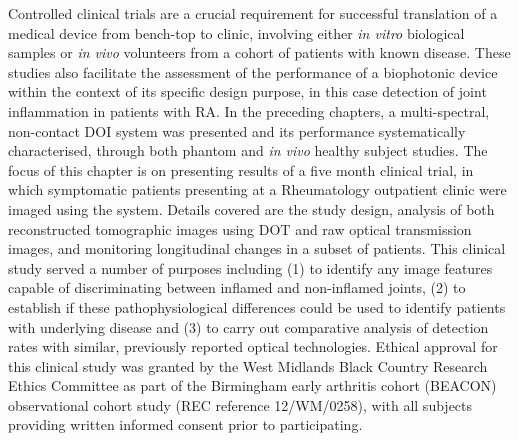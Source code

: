 \documentclass[twoside]{bhamthesis}
\theoremstyle{definition}
\begin{document}
Controlled clinical trials are a crucial requirement for successful translation of a medical device from bench-top to clinic, involving either \textit{in vitro} biological samples or \textit{in vivo} volunteers from a cohort of patients with known disease. These studies also facilitate the assessment of the performance of a biophotonic device within the context of its specific design purpose, in this case detection of joint inflammation in patients with RA. In the preceding chapters, a multi-spectral, non-contact DOI system was presented and its performance systematically characterised, through both phantom and \textit{in vivo} healthy subject studies. The focus of this chapter is on presenting results of a five month clinical trial, in which symptomatic patients presenting at a Rheumatology outpatient clinic were imaged using the system. Details covered are the study design, analysis of both reconstructed tomographic images using DOT and raw optical transmission images, and monitoring longitudinal changes in a subset of patients. This clinical study served a number of purposes including (1) to identify any image features capable of discriminating between inflamed and non-inflamed joints, (2) to establish if these pathophysiological differences could be used to identify patients with underlying disease and (3) to carry out comparative analysis of detection rates with similar, previously reported optical technologies. Ethical approval for this clinical study was granted by the West Midlands Black Country Research Ethics Committee as part of the Birmingham early arthritis cohort (BEACON) observational cohort study (REC reference 12/WM/0258), with all subjects providing written informed consent prior to participating.  
\end{document}
